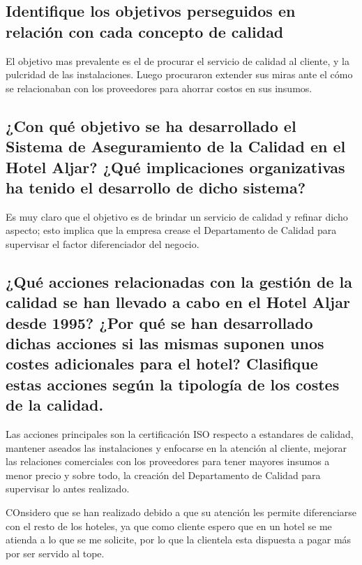 \documentclass[stu, 12pt, letterpaper, donotrepeattitle, floatsintext, natbib]{apa7}
\begin{document}
\subsection*{Identifique los objetivos perseguidos en relación con cada concepto de calidad}
\begin{justifying}
El objetivo mas prevalente es el de procurar el servicio de calidad al cliente, y la pulcridad de las instalaciones. Luego
procuraron extender sus miras ante el cómo se relacionaban con los proveedores para ahorrar costos en sus insumos.\par
\end{justifying}
\vspace{\baselineskip}
\subsection*{¿Con qué objetivo se ha desarrollado el Sistema de Aseguramiento de la Calidad en el Hotel Aljar? 
¿Qué implicaciones organizativas ha tenido el desarrollo de dicho sistema?}
\begin{justifying}
Es muy claro que el objetivo es de brindar un servicio de calidad y refinar dicho aspecto; esto implica
que la empresa crease el Departamento de Calidad para supervisar el factor diferenciador del negocio.\par
\end{justifying}
\vspace{\baselineskip}
\subsection*{¿Qué acciones relacionadas con la gestión de la calidad se han llevado a cabo en el Hotel Aljar desde 1995?
 ¿Por qué se han desarrollado dichas acciones si las mismas suponen unos costes adicionales para el hotel? Clasifique
 estas acciones según la tipología de los costes de la calidad.}
 \begin{justifying}
Las acciones principales son la certificación ISO respecto a estandares de calidad, mantener aseados las instalaciones
y enfocarse en la atención al cliente, mejorar las relaciones comerciales con los proveedores para tener mayores insumos a menor precio
y sobre todo, la creación del Departamento de Calidad para supervisar lo antes realizado.\par
COnsidero que se han realizado debido a que su atención les permite diferenciarse con el resto de los hoteles, ya que como cliente
espero que en un hotel se me atienda a lo que se me solicite, por lo que la clientela esta dispuesta a pagar más por ser servido al tope.\par
 \end{justifying}
\end{document}
